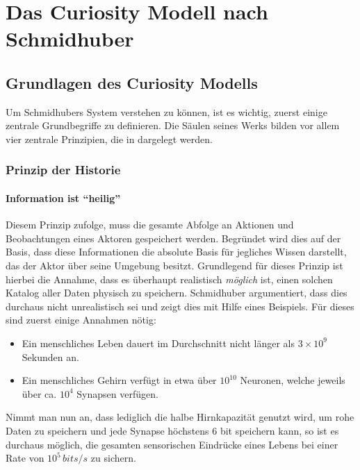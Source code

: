 
\section{Das Curiosity Modell nach Schmidhuber}
\label{sec:Curiosity_Schmidhuber}

\subsection{Grundlagen des Curiosity Modells}
\label{sec:Grundlegende_Prinzipien}

Um Schmidhubers System verstehen zu können, ist es wichtig, zuerst einige zentrale Grundbegriffe zu definieren.
Die Säulen seines Werks bilden vor allem vier zentrale Prinzipien, die in  dargelegt werden.

\subsubsection{Prinzip der Historie}

\paragraph{Information ist ``heilig''}
\label{sec:Information_Heilig}
Diesem Prinzip zufolge, muss die gesamte Abfolge an Aktionen und Beobachtungen eines Aktoren gespeichert werden. Begründet wird dies auf der Basis, dass diese Informationen die absolute Basis für jegliches Wissen darstellt, das der Aktor über seine Umgebung besitzt. 
Grundlegend für dieses Prinzip ist hierbei die Annahme, dass es überhaupt realistisch \emph{möglich} ist, einen solchen Katalog aller Daten physisch zu speichern.
Schmidhuber argumentiert, dass dies durchaus nicht unrealistisch sei und zeigt dies mit Hilfe eines Beispiels. 
Für dieses sind zuerst einige Annahmen nötig: 
\begin{itemize}
    \item Ein menschliches Leben dauert im Durchschnitt nicht länger als \(3\times10^9\) Sekunden an.
    \item Ein menschliches Gehirn verfügt in etwa über \(10^{10}\) Neuronen, welche jeweils über ca. \(10^{4}\) Synapsen verfügen.
\end{itemize}
Nimmt man nun an, dass lediglich die halbe Hirnkapazität genutzt wird, um rohe Daten zu speichern und jede Synapse höchstens 6 bit speichern kann, so ist es durchaus möglich, die gesamten sensorischen Eindrücke eines Lebens bei einer Rate von \(10^5\, bits/s\) zu sichern.

